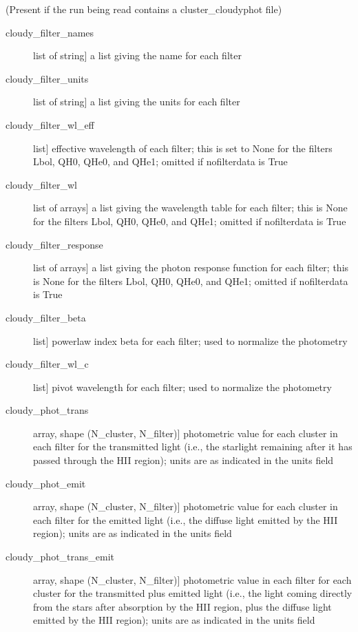 \documentclass[letterpaper,10pt,english]{sphinxmanual}
\begin{document}
\begin{fulllineitems}
\begin{description}
\begin{description}
\end{description}

(Present if the run being read contains a cluster\_cloudyphot file)
\begin{description}
\item[{cloudy\_filter\_names}] \leavevmode{[}list of string{]}
a list giving the name for each filter

\item[{cloudy\_filter\_units}] \leavevmode{[}list of string{]}
a list giving the units for each filter

\item[{cloudy\_filter\_wl\_eff}] \leavevmode{[}list{]}
effective wavelength of each filter; this is set to None for the
filters Lbol, QH0, QHe0, and QHe1; omitted if nofilterdata is
True

\item[{cloudy\_filter\_wl}] \leavevmode{[}list of arrays{]}
a list giving the wavelength table for each filter; this is
None for the filters Lbol, QH0, QHe0, and QHe1; omitted if
nofilterdata is True

\item[{cloudy\_filter\_response}] \leavevmode{[}list of arrays{]}
a list giving the photon response function for each filter;
this is None for the filters Lbol, QH0, QHe0, and QHe1; omitted
if nofilterdata is True

\item[{cloudy\_filter\_beta}] \leavevmode{[}list{]}
powerlaw index beta for each filter; used to normalize the
photometry

\item[{cloudy\_filter\_wl\_c}] \leavevmode{[}list{]}
pivot wavelength for each filter; used to normalize the photometry

\item[{cloudy\_phot\_trans}] \leavevmode{[}array, shape (N\_cluster, N\_filter){]}
photometric value for each cluster in each filter for the
transmitted light (i.e., the starlight remaining after it has
passed through the HII region); units are as indicated in
the units field

\item[{cloudy\_phot\_emit}] \leavevmode{[}array, shape (N\_cluster, N\_filter){]}
photometric value for each cluster in each filter for the
emitted light (i.e., the diffuse light emitted by the HII
region); units are as indicated in the units field

\item[{cloudy\_phot\_trans\_emit}] \leavevmode{[}array, shape (N\_cluster, N\_filter){]}
photometric value in each filter for each cluster for the
transmitted plus emitted light (i.e., the light coming
directly from the stars after absorption by the HII region,
plus the diffuse light emitted by the HII region); units are as
indicated in the units field


\end{description}
\end{description}
\end{fulllineitems}
\end{document}
